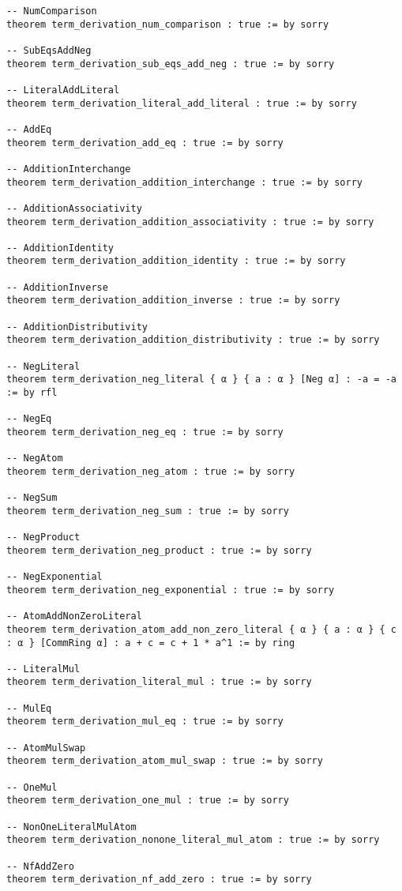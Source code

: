 \documentclass{article}
\begin{document}
\begin{tcolorbox}[colback=white!10, width=\linewidth]
\begin{lstlisting}[language=Lean4]
-- NumComparison
theorem term_derivation_num_comparison : true := by sorry

-- SubEqsAddNeg
theorem term_derivation_sub_eqs_add_neg : true := by sorry

-- LiteralAddLiteral
theorem term_derivation_literal_add_literal : true := by sorry

-- AddEq
theorem term_derivation_add_eq : true := by sorry

-- AdditionInterchange
theorem term_derivation_addition_interchange : true := by sorry

-- AdditionAssociativity
theorem term_derivation_addition_associativity : true := by sorry

-- AdditionIdentity
theorem term_derivation_addition_identity : true := by sorry

-- AdditionInverse
theorem term_derivation_addition_inverse : true := by sorry

-- AdditionDistributivity
theorem term_derivation_addition_distributivity : true := by sorry

-- NegLiteral
theorem term_derivation_neg_literal { α } { a : α } [Neg α] : -a = -a := by rfl

-- NegEq
theorem term_derivation_neg_eq : true := by sorry

-- NegAtom
theorem term_derivation_neg_atom : true := by sorry

-- NegSum
theorem term_derivation_neg_sum : true := by sorry

-- NegProduct
theorem term_derivation_neg_product : true := by sorry

-- NegExponential
theorem term_derivation_neg_exponential : true := by sorry

-- AtomAddNonZeroLiteral
theorem term_derivation_atom_add_non_zero_literal { α } { a : α } { c : α } [CommRing α] : a + c = c + 1 * a^1 := by ring

-- LiteralMul
theorem term_derivation_literal_mul : true := by sorry

-- MulEq
theorem term_derivation_mul_eq : true := by sorry

-- AtomMulSwap
theorem term_derivation_atom_mul_swap : true := by sorry

-- OneMul
theorem term_derivation_one_mul : true := by sorry

-- NonOneLiteralMulAtom
theorem term_derivation_nonone_literal_mul_atom : true := by sorry

-- NfAddZero
theorem term_derivation_nf_add_zero : true := by sorry


\end{lstlisting}
\end{tcolorbox}
\end{document}

